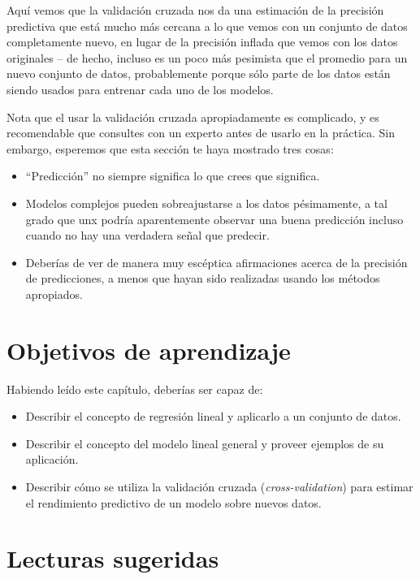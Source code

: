 \documentclass[
  12pt,
]{book}
\providecommand{\tightlist}{%
  \setlength{\itemsep}{0pt}\setlength{\parskip}{0pt}}
\begin{document}
Aquí vemos que la validación cruzada nos da una estimación de la precisión predictiva que está mucho más cercana a lo que vemos con un conjunto de datos completamente nuevo, en lugar de la precisión inflada que vemos con los datos originales -- de hecho, incluso es un poco más pesimista que el promedio para un nuevo conjunto de datos, probablemente porque sólo parte de los datos están siendo usados para entrenar cada uno de los modelos.

Nota que el usar la validación cruzada apropiadamente es complicado, y es recomendable que consultes con un experto antes de usarlo en la práctica. Sin embargo, esperemos que esta sección te haya mostrado tres cosas:

\begin{itemize}
\tightlist
\item
  ``Predicción'' no siempre significa lo que crees que significa.
\item
  Modelos complejos pueden sobreajustarse a los datos pésimamente, a tal grado que unx podría aparentemente observar una buena predicción incluso cuando no hay una verdadera señal que predecir.
\item
  Deberías de ver de manera muy escéptica afirmaciones acerca de la precisión de predicciones, a menos que hayan sido realizadas usando los métodos apropiados.
\end{itemize}

\hypertarget{objetivos-de-aprendizaje-13}{%
\section{Objetivos de aprendizaje}\label{objetivos-de-aprendizaje-13}}

Habiendo leído este capítulo, deberías ser capaz de:

\begin{itemize}
\tightlist
\item
  Describir el concepto de regresión lineal y aplicarlo a un conjunto de datos.
\item
  Describir el concepto del modelo lineal general y proveer ejemplos de su aplicación.
\item
  Describir cómo se utiliza la validación cruzada (\emph{cross-validation}) para estimar el rendimiento predictivo de un modelo sobre nuevos datos.
\end{itemize}

\hypertarget{lecturas-sugeridas-9}{%
\section{Lecturas sugeridas}\label{lecturas-sugeridas-9}}
\end{document}
